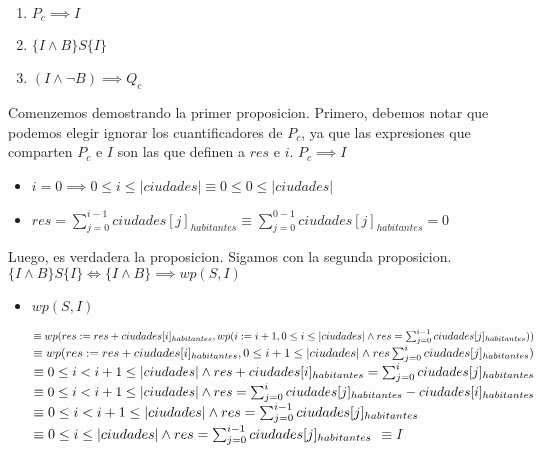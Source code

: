 \documentclass[10pt,a4paper]{article}
\begin{document}
\begin{enumerate} \setlength\itemsep{0cm}
	\item $P_c \implies I$
	\item $\{I \wedge B\}S\{I\}$
	\item $(I \wedge \neg B)\implies Q_c$
\end{enumerate}
Comenzemos demostrando la primer proposicion. Primero, debemos notar que podemos elegir ignorar los cuantificadores de $P_c$, ya que las expresiones que comparten $P_c$ e $I$ son las que definen a $res$ e $i$.
\newline \newline 
$P_c \implies I$
\begin{itemize}
	\item $i=0 \implies 0 \leq i \leq |ciudades| \equiv 0 \leq 0 \leq |ciudades|$
	\item $res = \sum_{j=0}^{i-1}ciudades[j]_{habitantes} \equiv \sum_{j=0}^{0-1}ciudades[j]_{habitantes}=0$
\end{itemize}
Luego, es verdadera la proposicion. Sigamos con la segunda proposicion.
\newline \newline 
$\{I \wedge B\}S\{I\} \iff \{I \wedge B\}\implies wp (S,I)$
\begin{itemize}
	\item $wp(S,I)$
	      \begin{adjustwidth}{2em}{}
		      $\equiv wp(res := res + ciudades[i]_{habitantes} , wp(i := i + 1 , 0 \leq i \leq |ciudades| \wedge res = \sum_{j=0}^{i-1}ciudades[j]_{habitantes})) \newline$
		      $\equiv wp(res := res+ciudades[i]_{habitantes},0 \leq i+1\leq |ciudades| \wedge res \sum_{j=0}^{i}ciudades[j]_{habitantes}) \newline$
		      $\equiv 0 \leq i < i+1 \leq |ciudades| \wedge res + ciudades[i]_{habitantes} = \sum_{j=0}^{i}ciudades[j]_{habitantes} \newline$
		      $\equiv 0 \leq i < i+1 \leq |ciudades| \wedge res = \sum_{j=0}^{i}ciudades[j]_{habitantes} - ciudades[i]_{habitantes}\newline$
		      $\equiv 0 \leq i < i+1 \leq |ciudades| \wedge res = \sum_{j=0}^{i-1}ciudades[j]_{habitantes}\newline$
		      $\equiv 0 \leq i \leq |ciudades| \wedge res = \sum_{j=0}^{i-1}ciudades[j]_{habitantes}\newline$
		      $\equiv I$
	      \end{adjustwidth}
\end{itemize}
\end{document}
